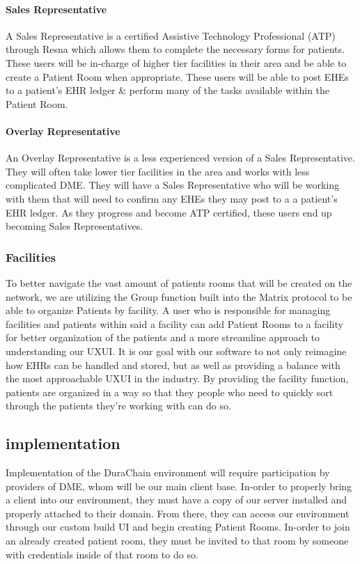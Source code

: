 \documentclass[12pt]{article}
\begin{document}
    \paragraph{Sales Representative}
    A Sales Representative is a certified Assistive Technology Professional (ATP) through Resna which allows them to complete the necessary forms for patients. These users will be in-charge of higher tier facilities in their area and be able to create a Patient Room when appropriate. These users will be able to post EHEs to a patient’s EHR ledger & perform many of the tasks available within the Patient Room.

    \paragraph{Overlay Representative}
    An Overlay Representative is a less experienced version of a Sales Representative. They will often take lower tier facilities in the area and works with less complicated DME. They will have a Sales Representative who will be working with them that will need to confirm any EHEs they may post to a a patient’s EHR ledger. As they progress and become ATP certified, these users end up becoming Sales Representatives.

  \subsubsection{Facilities}
  To better navigate the vast amount of patients rooms that will be created on the network, we are utilizing the Group function built into the Matrix protocol to be able to organize Patients by facility. A user who is responsible for managing facilities and patients within said a facility can add Patient Rooms to a facility for better organization of the patients and a more streamline approach to understanding our UXUI. It is our goal with our software to not only reimagine how EHRs can be handled and stored, but as well as providing a balance with the most approachable UXUI in the industry. By providing the facility function, patients are organized in a way so that they people who need to quickly sort through the patients they’re working with can do so.

\subsection{implementation}
Implementation of the DuraChain environment will require participation by providers of DME, whom will be our main client base. In-order to properly bring a client into our environment, they must have a copy of our server installed and properly attached to their domain. From there, they can access our environment through our custom build UI and begin creating Patient Rooms. In-order to join an already created patient room, they must be invited to that room by someone with credentials inside of that room to do so.
\end{document}
